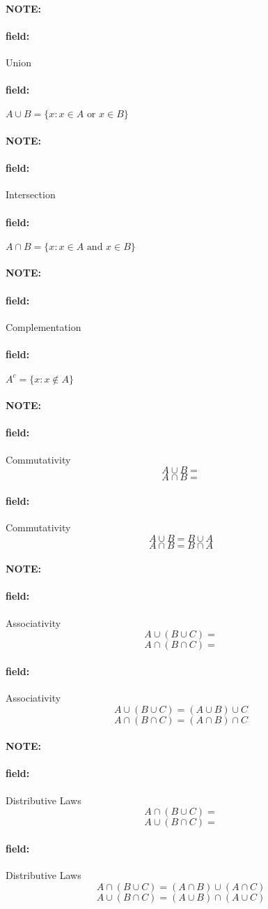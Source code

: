 \documentclass[12pt]{article}
\newenvironment{note}{\paragraph{NOTE:}}{}
\newenvironment{field}{\paragraph{field:}}{}
\begin{document}
\begin{note}
  \begin{field}
    Union
  \end{field}
  \begin{field}
    $ A \cup B = \{x:x \in A \text{ or } x \in B\}$
  \end{field}
\end{note}

\begin{note}
  \begin{field}
    Intersection
  \end{field}
  \begin{field}
    $A \cap B = \{x:x \in A \text{ and } x \in B\}$
  \end{field}
\end{note}

\begin{note}
  \begin{field}
    Complementation
  \end{field}
  \begin{field}
    $A^c = \{x:x\notin A\}$
  \end{field}
\end{note}

\begin{note}
  \begin{field}
    Commutativity
    $$ A \cup B = $$
    $$ A \cap B = $$
  \end{field}
  \begin{field}
    Commutativity
    $$ A \cup B = B \cup A$$
    $$ A \cap B = B \cap A$$
  \end{field}
\end{note}

\begin{note}
  \begin{field}
    Associativity
    $$ A \cup (B \cup C) = $$
    $$ A \cap (B \cap C) = $$
  \end{field}
    \begin{field}
      Associativity
        $$ A \cup (B \cup C) = (A \cup B) \cup C$$
        $$ A \cap (B \cap C) = (A \cap B) \cap C$$
    \end{field}
\end{note}

\begin{note}
  \begin{field}
    Distributive Laws
    $$A \cap ( B \cup C) = $$
    $$ A \cup ( B \cap C) = $$
  \end{field}
    \begin{field}
      Distributive Laws
        $$A \cap ( B \cup C) = (A \cap B) \cup (A \cap C)$$
        $$ A \cup ( B \cap C) = (A \cup B) \cap ( A \cup C)$$
    \end{field}
\end{note}
\end{document}
